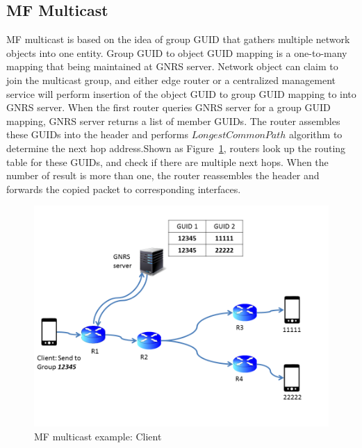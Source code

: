 \subsection{MF Multicast}\label{sec:multi}
MF multicast is based on the idea of group GUID that gathers multiple network objects into one entity. Group GUID  to object GUID mapping is a one-to-many mapping that being maintained at GNRS server. Network object can claim to join the multicast group, and either edge router or a centralized management service will perform insertion of the object GUID to group GUID mapping to into GNRS server. When the first router queries GNRS server for a group GUID mapping, GNRS server returns a list of member GUIDs. The router assembles these GUIDs into the header and performs $Longest Common Path$ algorithm to determine the next hop address.Shown as Figure~\ref{fig:multicast}, routers look up the routing table for these GUIDs, and check if there are multiple next hops. When the number of result is more than one, the router reassembles the header and forwards the copied packet to corresponding interfaces.
\begin{figure}
\centering
\includegraphics[width=\columnwidth]{figure/multicast.png}
\caption{\label{fig:multicast}MF multicast example: Client }
\end{figure}  
